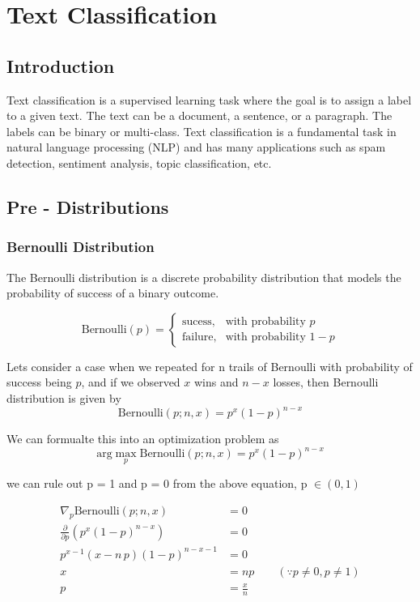 \chapter{Text Classification}

\section{Introduction}

Text classification is a supervised learning task where the goal is to assign a label to a given text. 
The text can be a document, a sentence, or a paragraph. The labels can be binary or multi-class. 
Text classification is a fundamental task in natural language processing (NLP) and has many applications such as spam detection, sentiment analysis, topic classification, etc.

\section{Pre - Distributions}
\subsection{Bernoulli Distribution}

The Bernoulli distribution is a discrete probability distribution that models the probability of success of a binary outcome.

\[   
\text{Bernoulli}(p) = 
     \begin{cases}
       \text{sucess,} & \text{with probability } p \\
	   \text{failure,} & \text{with probability } 1 - p
     \end{cases}
\]

Lets consider a case when we repeated for n trails of Bernoulli with probability of success being $p$, and if we observed $x$ wins and $n-x$ losses, 
then Bernoulli distribution is given by
$$
\text{Bernoulli}(p ; n, x) = p^x (1 - p)^{n - x} 
$$

\sol 
We can formualte this into an optimization problem as 
\[
	\text{arg} \max_p \text{Bernoulli}(p ; n, x) = p^x (1 - p)^{n - x} 
\]

we can rule out p = 1 and p = 0 from the above equation, p \(\in (0,1) \)

\begin{align*}
	\nabla_p \text{Bernoulli}(p ; n, x) & = 0 \\
	{\frac{\partial}{\partial p}}(p^{x}\left(1-p\right)^{n-x}) & = 0 \\
	p^{x-1}\left(x-n\,p\right)\left(1-p\right)^{n-x-1} &= 0\\
	x & = np \quad \quad (\because p \neq 0, p \neq 1) \\
	p & = \frac{x}{n}
\end{align*}

